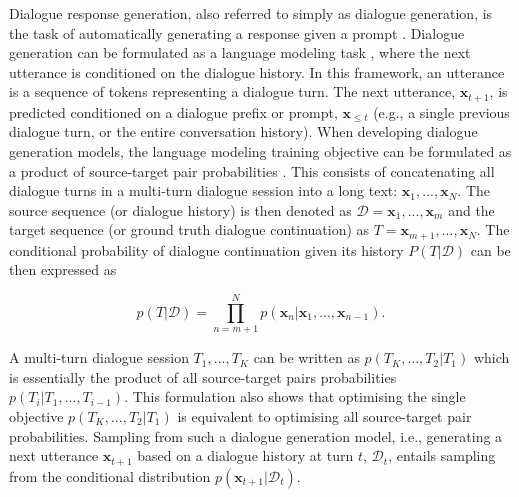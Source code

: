 Dialogue response generation, also referred to simply as dialogue generation, is the task of automatically generating a response given a prompt \citep{madotto-etal-2020-plug}. 
Dialogue generation can be formulated as a language modeling task \citep{welleck-etal-2019-dialogue}, where the next utterance is conditioned on the dialogue history.
In this framework, an utterance is a sequence of tokens representing a dialogue turn. The next utterance, $\textbf{x}_{t + 1}$, is predicted conditioned on a dialogue prefix or prompt, $\textbf{x}_{\leq t}$ (e.g., a single previous dialogue turn, or the entire conversation history). 
When developing dialogue generation models, the language modeling training objective can be formulated as a product of source-target pair probabilities \citep{zhang2019dialogpt}. This consists of concatenating all dialogue turns in a multi-turn dialogue session into a long text: $\textbf{x}_1, ..., \textbf{x}_N$. The source sequence (or dialogue history) is then denoted as $\mathcal{D} = \textbf{x}_1, ..., \textbf{x}_m$ and the target sequence (or ground truth dialogue continuation) as $T = \textbf{x}_{m + 1}, ..., \textbf{x}_N$. The conditional probability of dialogue continuation given its history $P(T | \mathcal{D})$ can be then expressed as

\begin{equation}
    p(T | \mathcal{D}) = \prod_{n = m + 1}^N p(\textbf{x}_n | \textbf{x}_1, ..., \textbf{x}_{n - 1}).
\end{equation}

A multi-turn dialogue session $T_1, ..., T_K$ can be written as $p(T_K, ..., T_2 | T_1)$ which is essentially the product of all source-target pairs probabilities $p(T_i | T_1, ..., T_{i - 1})$. This formulation also shows that optimising the single objective $p(T_K, ..., T_2 | T_1)$ is equivalent to optimising all source-target pair probabilities. Sampling from such a dialogue generation model, i.e., generating a next utterance $\textbf{x}_{t + 1}$ based on a dialogue history at turn $t$, $\mathcal{D}_t$, entails sampling from the conditional distribution $p(\textbf{x}_{t + 1} | \mathcal{D}_t)$.

